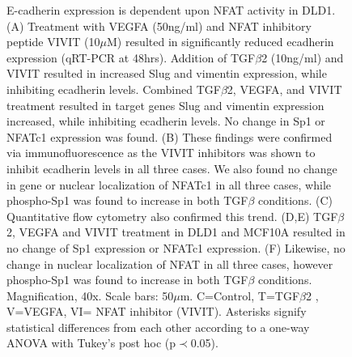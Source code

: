 \documentclass[11pt,letterpaper]{article}
\begin{document}
\begin{figure}
\caption{E-cadherin expression is dependent upon NFAT activity in DLD1.
(A) Treatment with VEGFA (50ng/ml) and NFAT inhibitory peptide VIVIT (10$\mu$M) resulted in significantly reduced ecadherin expression (qRT-PCR at 48hrs).
Addition of TGF$\beta$2 (10ng/ml) and VIVIT resulted in increased Slug and vimentin expression, while inhibiting ecadherin levels.
Combined TGF$\beta$2, VEGFA, and VIVIT treatment resulted in target genes Slug and vimentin expression increased, while inhibiting ecadherin levels.
No change in Sp1 or NFATc1 expression was found.
(B) These findings were confirmed via immunofluorescence as the VIVIT inhibitors was shown to inhibit ecadherin levels in all three cases.
We also found no change in gene or nuclear localization of NFATc1 in all three cases, while phospho-Sp1 was found to increase in both TGF$\beta$ conditions.
(C) Quantitative flow cytometry also confirmed this trend.
(D,E)  TGF$\beta$2, VEGFA and VIVIT treatment in DLD1 and MCF10A resulted in no change of Sp1 expression or NFATc1 expression.
(F)  Likewise, no change in nuclear localization of NFAT in all three cases, however phospho-Sp1 was found to increase in both TGF$\beta$ conditions.
Magnification, 40x. Scale bars: 50$\mu$m.  C=Control, T=TGF$\beta$2 , V=VEGFA, VI= NFAT inhibitor (VIVIT).
Asterisks signify statistical differences from each other according to a one-way ANOVA with Tukey's post hoc (p$\prec$0.05).}\label{fg:S4}
\end{figure}

\newpage
%
\end{document}
